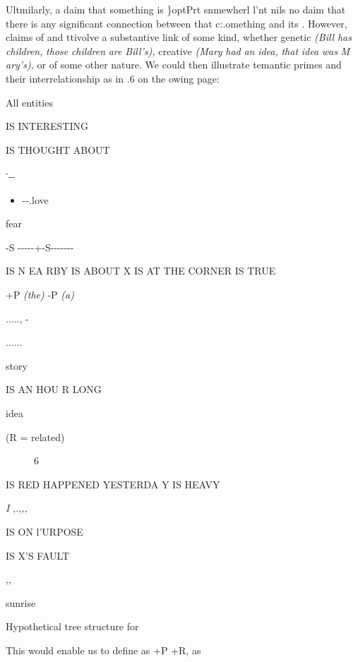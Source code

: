 Ultmilarly, a daim that something is \}optPrt snmewherl l'nt nils no daim that there is any significant connection between that c:.ome\-thing and its . However, claims of  and  ttivolve a substantive link of some kind, whether genetic \textit{(Bill} \textit{has} \textit{children,} \textit{those} \textit{children} \textit{are} \textit{Bill's),} creative \textit{(Mary} \textit{had} \textit{an} \textit{idea,} \textit{that} \textit{idea} \textit{was} \textit{M} \textit{ary's),} or of some other nature. We could then illustrate temantic primes and their interrelationship as in .6 on the
owing page:



All entities 

IS INTERESTING

IS THOUGHT ABOUT

\textsuperscript{{}-}{}-{}- 

\begin{itemize}
\item {}-{}-.love
\end{itemize}

fear

{}-S {}-{}-{}-{}-{}-+{}-S{}-{}-{}-{}-{}-{}-{}-

IS N EA RBY IS ABOUT X IS AT THE CORNER IS TRUE 

+P \textit{(th}\textit{e}\textit{) }{}-P \textit{(}\textit{a}\textit{)} 

....., -

......

story

IS AN HOU R LONG 

idea

(R = related)

\begin{figure}
\caption{6}
\label{fig:4}
\end{figure}

IS RED HAPPENED YESTERDA Y IS HEAVY

\textit{I },\textit{.},\textit{,,}

IS ON l'URPOSE

IS X'S FAULT

,,

sunrise

Hypothetical tree structure for 

This would enable us to define  as +P +R,  as

